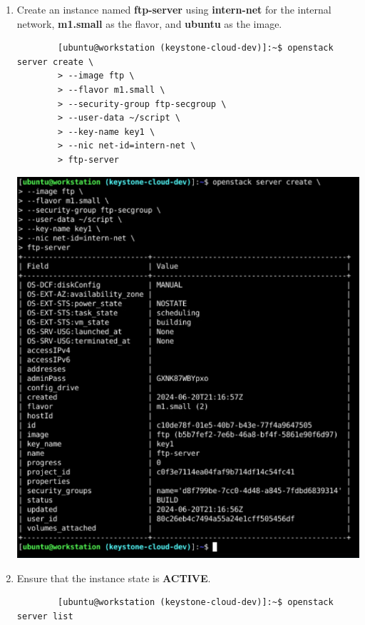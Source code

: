 \documentclass[letterpaper, 12pt]{article}
\begin{document}
\begin{enumerate}
    \item Create an instance named \textbf{ftp-server} using \textbf{intern-net} for the internal network,
    \textbf{m1.small} as the flavor, and \textbf{ubuntu} as the image.
    \begin{lstlisting}
        [ubuntu@workstation (keystone-cloud-dev)]:~$ openstack server create \
        > --image ftp \
        > --flavor m1.small \
        > --security-group ftp-secgroup \
        > --user-data ~/script \
        > --key-name key1 \
        > --nic net-id=intern-net \
        > ftp-server
    \end{lstlisting}

    \begin{center}
        \includegraphics[width=\linewidth]{images/part2/step1.png}
    \end{center}

    \item Ensure that the instance state is \textbf{ACTIVE}.
    \begin{lstlisting}
        [ubuntu@workstation (keystone-cloud-dev)]:~$ openstack server list
    \end{lstlisting}


\end{enumerate}
\end{document}
